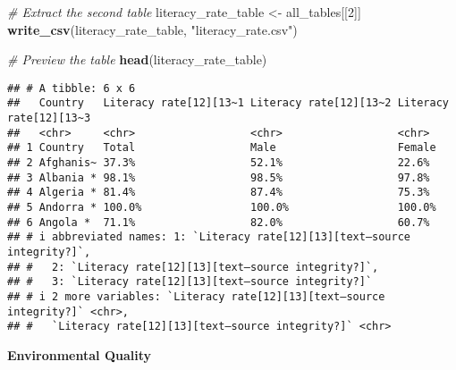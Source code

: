\documentclass[
]{article}
\newenvironment{Shaded}{\begin{snugshade}}{\end{snugshade}}
\newcommand{\CommentTok}[1]{\textcolor[rgb]{0.56,0.35,0.01}{\textit{#1}}}
\newcommand{\DecValTok}[1]{\textcolor[rgb]{0.00,0.00,0.81}{#1}}
\newcommand{\FunctionTok}[1]{\textcolor[rgb]{0.13,0.29,0.53}{\textbf{#1}}}
\newcommand{\NormalTok}[1]{#1}
\newcommand{\OtherTok}[1]{\textcolor[rgb]{0.56,0.35,0.01}{#1}}
\newcommand{\StringTok}[1]{\textcolor[rgb]{0.31,0.60,0.02}{#1}}
\begin{document}
\begin{Shaded}
\begin{Highlighting}[]
\CommentTok{\# Extract the second table }
\NormalTok{literacy\_rate\_table }\OtherTok{\textless{}{-}}\NormalTok{ all\_tables[[}\DecValTok{2}\NormalTok{]]}
\FunctionTok{write\_csv}\NormalTok{(literacy\_rate\_table, }\StringTok{"literacy\_rate.csv"}\NormalTok{)}

\CommentTok{\# Preview the table}
\FunctionTok{head}\NormalTok{(literacy\_rate\_table)}
\end{Highlighting}
\end{Shaded}

\begin{verbatim}
## # A tibble: 6 x 6
##   Country   Literacy rate[12][13~1 Literacy rate[12][13~2 Literacy rate[12][13~3
##   <chr>     <chr>                  <chr>                  <chr>                 
## 1 Country   Total                  Male                   Female                
## 2 Afghanis~ 37.3%                  52.1%                  22.6%                 
## 3 Albania * 98.1%                  98.5%                  97.8%                 
## 4 Algeria * 81.4%                  87.4%                  75.3%                 
## 5 Andorra * 100.0%                 100.0%                 100.0%                
## 6 Angola *  71.1%                  82.0%                  60.7%                 
## # i abbreviated names: 1: `Literacy rate[12][13][text–source integrity?]`,
## #   2: `Literacy rate[12][13][text–source integrity?]`,
## #   3: `Literacy rate[12][13][text–source integrity?]`
## # i 2 more variables: `Literacy rate[12][13][text–source integrity?]` <chr>,
## #   `Literacy rate[12][13][text–source integrity?]` <chr>
\end{verbatim}

\textbf{Environmental Quality}
\end{document}
